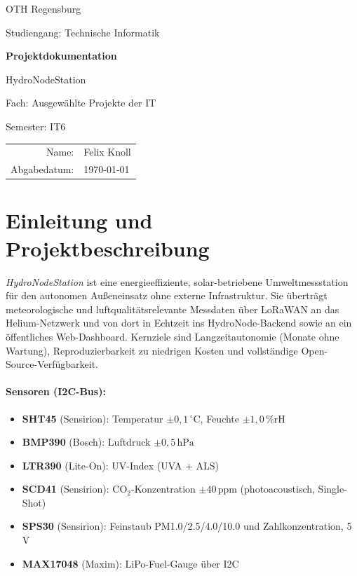 \documentclass[11pt,a4paper]{scrartcl}
\begin{document}
\begin{titlepage}
  \centering
  \vspace*{2cm}
  {\Large OTH Regensburg\par}
  \vspace{0.8cm}
  {\large Studiengang: Technische Informatik\par}
  \vspace{2.5cm}
  {\Huge\bfseries Projektdokumentation\par}
  \vspace{0.6cm}
  {\LARGE HydroNodeStation\par}
  \vspace{1.5cm}
  {\large Fach: Ausgewählte Projekte der IT\par}
  \vspace{0.3cm}
  {\large Semester: IT6\par}
  \vfill
  \begin{tabular}{rl}
    Name:           & Felix Knoll \\
    Abgabedatum:    & \today
  \end{tabular}
\end{titlepage}

\tableofcontents
\clearpage

\section{Einleitung und Projektbeschreibung}

\textit{HydroNodeStation} ist eine energieeffiziente, solar-betriebene Umweltmessstation für den autonomen Außeneinsatz ohne externe Infrastruktur. Sie überträgt meteorologische und luftqualitätsrelevante Messdaten über LoRaWAN an das Helium-Netzwerk und von dort in Echtzeit ins HydroNode-Backend sowie an ein öffentliches Web-Dashboard. Kernziele sind Langzeitautonomie (Monate ohne Wartung), Reproduzierbarkeit zu niedrigen Kosten und vollständige Open-Source-Verfügbarkeit.

\paragraph{Sensoren (I2C-Bus):}
\begin{itemize}
  \item \textbf{SHT45} (Sensirion): Temperatur $\pm0{,}1\,^\circ$C, Feuchte $\pm1{,}0\,\%\text{rH}$
  \item \textbf{BMP390} (Bosch): Luftdruck $\pm0{,}5\,\text{hPa}$
  \item \textbf{LTR390} (Lite-On): UV-Index (UVA + ALS)
  \item \textbf{SCD41} (Sensirion): CO$_2$-Konzentration $\pm40\,\text{ppm}$ (photoacoustisch, Single-Shot)
  \item \textbf{SPS30} (Sensirion): Feinstaub PM1.0/2.5/4.0/10.0 und Zahlkonzentration, 5\,V
  \item \textbf{MAX17048} (Maxim): LiPo-Fuel-Gauge über I2C
\end{itemize}
\end{document}
